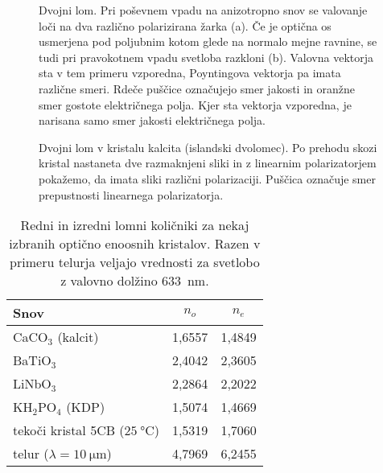 \begin{figure}[h]
\centering
\def\svgwidth{140truemm} 

\caption{Dvojni lom. Pri poševnem vpadu na anizotropno snov se
valovanje loči na dva različno polarizirana žarka (a). Če je optična os 
usmerjena pod poljubnim kotom glede na normalo mejne ravnine, se tudi pri pravokotnem vpadu
svetloba razkloni (b). Valovna vektorja sta v tem primeru vzporedna, 
Poyntingova vektorja pa imata različne smeri. Rdeče puščice označujejo smer
jakosti in oranžne smer gostote električnega polja. Kjer sta vektorja vzporedna, je narisana
samo smer jakosti električnega polja.}
\label{fig:dvolomnost}
\end{figure}

\begin{figure}[h]
\centering
\def\svgwidth{140truemm} 

\caption{Dvojni lom v kristalu kalcita (islandski dvolomec). 
Po prehodu skozi kristal nastaneta dve razmaknjeni sliki in z linearnim polarizatorjem 
pokažemo, da imata sliki različni polarizaciji. Puščica označuje smer prepustnosti
linearnega polarizatorja.}
\label{foto:dvolom}
\end{figure}

\begin{table}[h]
 \centering
\begin{tabular}{|l|c|c|} \hline  
      Snov & $n_o$ & $n_e$ \\ \hline
      CaCO$_3$ (kalcit) & 1,6557 & 1,4849 \\ \hline\index{CaCO$_3$|see {Kalcit}}
      BaTiO$_3$ & 2,4042 & 2,3605 \\ \hline \index{BaTiO$_3$}
      LiNbO$_3$ & 2,2864 & 2,2022 \\ \hline \index{LiNbO$_3$}
      KH$_2$PO$_4$ (KDP) & 1,5074 & 1,4669 \\ \hline \index{KH$_2$PO$_4$|see {KDP}}\index{KDP}
      tekoči kristal 5CB ($25~\si{\degreeCelsius}$) & 1,5319 & 1,7060 \\ 
      \hline \index{Tekoči kristali} \index{Telur}\index{Tekoči kristali!5CB}
      telur ($\lambda = 10~\si{\micro\metre}$) & 4,7969 & 6,2455 \\ 
\hline 
\end{tabular}
  \caption{Redni in izredni lomni količniki za nekaj izbranih optično enoosnih kristalov. Razen v primeru telurja
   veljajo vrednosti za svetlobo z valovno dolžino 633~\si{\nano\metre}.}
\label{table:none}
\end{table}


